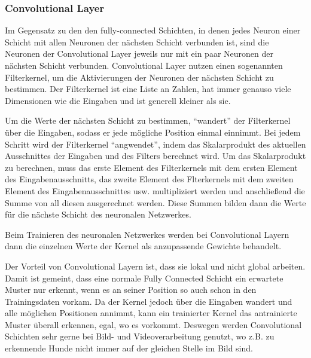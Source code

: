 \documentclass[10pt]{article}
\newcommand{\feng}[1]{{#1}}
\begin{document}
\subsubsection{Convolutional Layer}

Im Gegensatz zu den den fully-connected Schichten, in denen jedes Neuron einer Schicht mit allen Neuronen der nächsten Schicht verbunden ist, sind die Neuronen der Convolutional Layer jeweils nur mit ein paar Neuronen der nächsten Schicht verbunden.
Convolutional Layer nutzen einen sogenannten Filterkernel, um die Aktivierungen der Neuronen der nächsten Schicht zu bestimmen.
Der Filterkernel ist eine Liste an Zahlen, hat immer genauso viele Dimensionen wie die Eingaben und ist generell kleiner als sie. 

Um die Werte der nächsten Schicht zu bestimmen, \enquote{wandert} der Filterkernel über die Eingaben, sodass er jede mögliche Position einmal einnimmt.
Bei jedem Schritt wird der Filterkernel \enquote{angwendet}, indem das Skalarprodukt des aktuellen Ausschnittes der Eingaben und des Filters berechnet wird. 
Um das Skalarprodukt zu berechnen, muss das erste Element des Filterkernels mit dem ersten Element des Eingabenausschnitts, das zweite Element des Flterkernels mit dem zweiten Element des Eingabenausschnittes usw. multipliziert werden und anschließend die Summe von all diesen ausgerechnet werden.
Diese Summen bilden dann die Werte für die nächste Schicht des neuronalen Netzwerkes.

Beim Trainieren des neuronalen Netzwerkes werden bei Convolutional Layern dann die einzelnen Werte der Kernel als anzupassende Gewichte behandelt.

Der Vorteil von Convolutional Layern ist, dass sie lokal und nicht global arbeiten.
Damit ist gemeint, dass eine normale Fully Connected Schicht ein erwartete Muster nur erkennt, wenn es an seiner Position so auch schon in den Trainingsdaten vorkam.
Da der Kernel jedoch über die Eingaben wandert und alle möglichen Positionen annimmt, kann ein trainierter Kernel das antrainierte Muster überall erkennen, egal, wo es vorkommt.
Deswegen werden Convolutional Schichten sehr gerne bei Bild- und Videoverarbeitung genutzt, wo z.B. zu erkennende Hunde nicht immer auf der gleichen Stelle im Bild sind.
\end{document}
